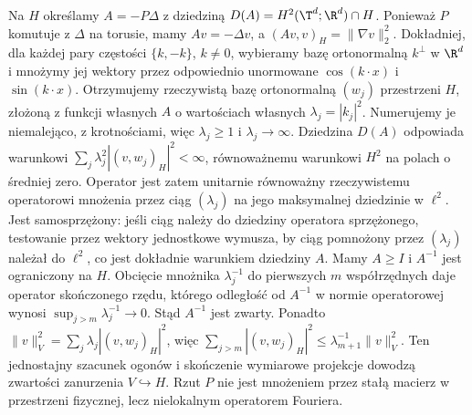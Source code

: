 \begin{uwaga}
Na $H$ określamy $A=-P\Delta$ z dziedziną
$D(A)=H^2(\T^d;\R^d)\cap H$. Ponieważ $P$ komutuje
z $\Delta$ na torusie, mamy $Av=-\Delta v$, a
$(Av,v)_H=\|\nabla v\|_2^2$. Dokładniej, dla każdej
pary częstości $\{k,-k\}$, $k\ne0$, wybieramy bazę
ortonormalną $k^\perp$ w $\R^d$ i mnożymy jej wektory
przez odpowiednio unormowane $\cos(k\cdot x)$
i $\sin(k\cdot x)$. Otrzymujemy rzeczywistą bazę
ortonormalną $(w_j)$ przestrzeni $H$, złożoną
z funkcji własnych $A$ o wartościach własnych
$\lambda_j=|k_j|^2$. Numerujemy je niemalejąco,
z krotnościami, więc $\lambda_j\ge1$ i
$\lambda_j\to\infty$.
Dziedzina $D(A)$ odpowiada warunkowi
$\sum_j\lambda_j^2|(v,w_j)_H|^2<\infty$,
równoważnemu warunkowi $H^2$ na polach o średniej zero.
Operator jest zatem unitarnie równoważny rzeczywistemu
operatorowi mnożenia przez ciąg $(\lambda_j)$
na jego maksymalnej dziedzinie w $\ell^2$.
Jest samosprzężony: jeśli ciąg należy do dziedziny
operatora sprzężonego, testowanie przez wektory
jednostkowe wymusza, by ciąg pomnożony przez
$(\lambda_j)$ należał do $\ell^2$, co jest dokładnie
warunkiem dziedziny $A$.
Mamy $A\ge I$ i $A^{-1}$ jest ograniczony na $H$.
Obcięcie mnożnika $\lambda_j^{-1}$ do pierwszych $m$
współrzędnych daje operator skończonego rzędu,
którego odległość od $A^{-1}$ w normie operatorowej
wynosi $\sup_{j>m}\lambda_j^{-1}\to0$.
Stąd $A^{-1}$ jest zwarty. Ponadto
$\|v\|_V^2=\sum_j\lambda_j|(v,w_j)_H|^2$,
więc
$\sum_{j>m}|(v,w_j)_H|^2\le
\lambda_{m+1}^{-1}\|v\|_V^2$.
Ten jednostajny szacunek ogonów i skończenie wymiarowe
projekcje dowodzą zwartości zanurzenia $V\hookrightarrow H$.
Rzut $P$ nie jest mnożeniem przez stałą macierz w przestrzeni
fizycznej, lecz nielokalnym operatorem Fouriera.
\end{uwaga}


